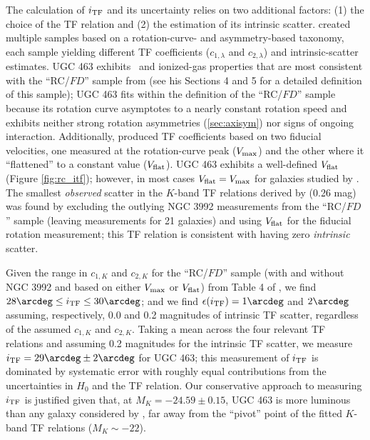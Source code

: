 \documentclass[apj,iop,numberedappendix]{emulateapj}
\begin{document}
The calculation of $i_{\rm TF}$ and its uncertainty relies on two additional factors:
(1) the choice of the TF relation and (2) the estimation of its intrinsic
scatter.   created multiple samples based on a
rotation-curve- and asymmetry-based taxonomy, each sample yielding different TF
coefficients ($c_{1,\lambda}$ and $c_{2,\lambda}$) and intrinsic-scatter
estimates.  UGC 463 exhibits \hone\ and ionized-gas properties that are most
consistent with the ``RC/$FD$'' sample from 
(see his Sections 4 and 5 for a detailed definition of this sample); UGC 463
fits within the definition of the ``RC/$FD$'' sample because its rotation curve
asymptotes to a nearly constant rotation speed and exhibits neither strong
rotation asymmetries (\sect \ref{sec:axisym}) nor signs of ongoing interaction.
Additionally,  produced TF coefficients based on
two fiducial velocities, one measured at the rotation-curve peak ($V_{\rm max}$) and
the other where it ``flattened'' to a constant value ($V_{\rm flat}$).  UGC 463
exhibits a well-defined $V_{\rm flat}$ (Figure \ref{fig:rc_itf}); however, in most
cases $V_{\rm flat}=V_{\rm max}$ for galaxies studied by .
The smallest {\it observed} scatter in the $K$-band TF relations derived by
 (0.26 mag) was found by excluding the outlying
NGC 3992 measurements from the ``RC/$FD$'' sample (leaving measurements for 21
galaxies) and using $V_{\rm flat}$ for the fiducial rotation measurement; this TF
relation is consistent with having zero {\it intrinsic} scatter.

Given the range in $c_{1,K}$ and $c_{2,K}$ for the ``RC/$FD$'' sample (with and
without NGC 3992 and based on either $V_{\rm max}$ or $V_{\rm flat}$) from Table 4 of
, we find $28\arcdeg\leq \itf\leq 30\arcdeg$;
and we find $\epsilon(\itf) = 1\arcdeg$ and $2\arcdeg$ assuming, respectively,
0.0 and 0.2 magnitudes of intrinsic TF scatter, regardless of the assumed
$c_{1,K}$ and $c_{2,K}$.  Taking a mean across the four relevant TF relations
and assuming 0.2 magnitudes for the intrinsic TF scatter, we measure $\itf =
29\arcdeg\pm2\arcdeg$ for UGC 463; this measurement of $i_{\rm TF}$ is dominated by
systematic error with roughly equal contributions from the uncertainties in
$H_0$ and the TF relation.  Our conservative approach to measuring $i_{\rm TF}$ is
justified given that, at $M_K = -24.59\pm0.15$, UGC 463 is more luminous than
any galaxy considered by , far away from the
``pivot'' point of the fitted $K$-band TF relations ($M_K\sim -22$).
\end{document}
